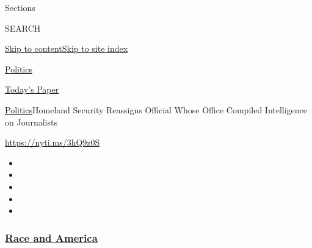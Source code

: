 Sections

SEARCH

\protect\hyperlink{site-content}{Skip to
content}\protect\hyperlink{site-index}{Skip to site index}

\href{https://www.nytimes3xbfgragh.onion/section/politics}{Politics}

\href{https://myaccount.nytimes3xbfgragh.onion/auth/login?response_type=cookie\&client_id=vi}{}

\href{https://www.nytimes3xbfgragh.onion/section/todayspaper}{Today's
Paper}

\href{/section/politics}{Politics}\textbar{}Homeland Security Reassigns
Official Whose Office Compiled Intelligence on Journalists

\url{https://nyti.ms/3hQ9z0S}

\begin{itemize}
\item
\item
\item
\item
\item
\end{itemize}

\hypertarget{race-and-america}{%
\subsubsection{\texorpdfstring{\href{https://www.nytimes3xbfgragh.onion/news-event/george-floyd-protests-minneapolis-new-york-los-angeles?name=styln-george-floyd\&region=TOP_BANNER\&variant=undefined\&block=storyline_menu_recirc\&action=click\&pgtype=Article\&impression_id=dc3cef20-e393-11ea-adda-c17bab336bc5}{Race
and America}}{Race and America}}\label{race-and-america}}


